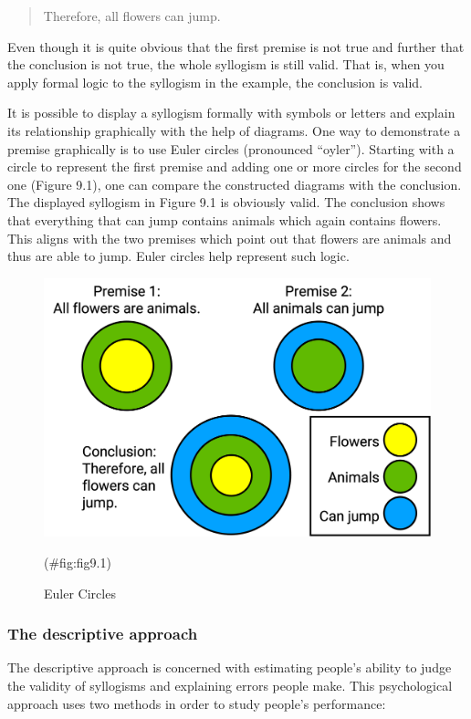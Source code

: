 \documentclass[
]{krantz}
\begin{document}
\begin{quote}
Therefore, all flowers can jump.
\end{quote}

Even though it is quite obvious that the first premise is not true and further that the conclusion is not true, the whole syllogism is still valid. That is, when you apply formal logic to the syllogism in the example, the conclusion is valid.

It is possible to display a syllogism formally with symbols or letters and explain its relationship graphically with the help of diagrams. One way to demonstrate a premise graphically is to use Euler circles (pronounced ``oyler''). Starting with a circle to represent the first premise and adding one or more circles for the second one (Figure 9.1), one can compare the constructed diagrams with the conclusion. The displayed syllogism in Figure 9.1 is obviously valid. The conclusion shows that everything that can jump contains animals which again contains flowers. This aligns with the two premises which point out that flowers are animals and thus are able to jump. Euler circles help represent such logic.

\begin{figure}

{\centering \includegraphics[width=0.6\linewidth]{images/ch9/fig1} 

}

\caption{Euler Circles}(\#fig:fig9.1)
\end{figure}

\hypertarget{the-descriptive-approach}{%
\subsubsection*{The descriptive approach}\label{the-descriptive-approach}}


The descriptive approach is concerned with estimating people's ability to judge the validity of syllogisms and explaining errors people make. This psychological approach uses two methods in order to study people's performance:
\end{document}
